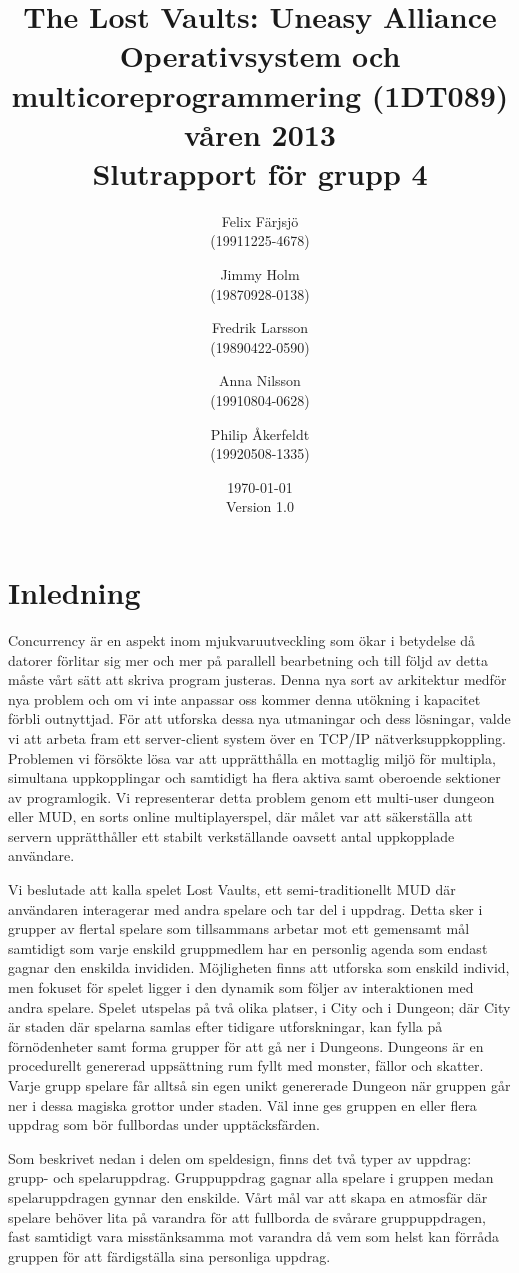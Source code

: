 \documentclass[a4paper]{article}
\title{The Lost Vaults: Uneasy Alliance\\\small{Operativsystem och multicoreprogrammering (1DT089) våren 2013}\\\small{Slutrapport för grupp 4}}
\author{Felix Färjsjö\\(19911225-4678) \and Jimmy Holm\\(19870928-0138) \and Fredrik Larsson\\(19890422-0590) \and Anna Nilsson\\(19910804-0628) \and Philip Åkerfeldt\\(19920508-1335)}
\date{\today\\Version 1.0}
\begin{document}
\maketitle
\newpage
\tableofcontents
\listoffigures
\newpage
\section{Inledning}
Concurrency är en aspekt inom mjukvaruutveckling som ökar i betydelse då datorer förlitar sig mer och mer på parallell bearbetning och till följd av detta måste vårt sätt att skriva 
program justeras. Denna nya sort av arkitektur medför nya problem och om vi inte anpassar oss kommer denna utökning i kapacitet förbli outnyttjad. För att utforska dessa nya utmaningar 
och dess lösningar, valde vi att arbeta fram ett server-client system över en TCP/IP nätverksuppkoppling. Problemen vi försökte lösa var att upprätthålla en mottaglig miljö för multipla, 
simultana uppkopplingar och samtidigt ha flera aktiva samt oberoende sektioner av programlogik. Vi representerar detta problem genom ett multi-user dungeon eller MUD, 
en sorts online multiplayerspel, där målet var att säkerställa att servern upprätthåller ett stabilt verkställande oavsett antal uppkopplade användare.
    
Vi beslutade att kalla spelet Lost Vaults, ett semi-traditionellt MUD där användaren interagerar med andra spelare och tar del i uppdrag. Detta sker i grupper av flertal spelare som 
tillsammans arbetar mot ett gemensamt mål samtidigt som varje enskild gruppmedlem har en personlig agenda som endast gagnar den enskilda invididen. Möjligheten finns att utforska som 
enskild individ, men fokuset för spelet ligger i den dynamik som följer av interaktionen med andra spelare. Spelet utspelas på två olika platser, i City och i Dungeon; där City är 
staden där spelarna samlas efter tidigare utforskningar, kan fylla på förnödenheter samt forma grupper för att gå ner i Dungeons. Dungeons är en procedurellt genererad uppsättning 
rum fyllt med monster, fällor och skatter. Varje grupp spelare får alltså sin egen unikt genererade Dungeon när gruppen går ner i dessa magiska grottor under staden. Väl inne ges 
gruppen en eller flera uppdrag som bör fullbordas under upptäcksfärden.
  
Som beskrivet nedan i delen om speldesign, finns det två typer av uppdrag: grupp- och spelaruppdrag. Gruppuppdrag gagnar alla spelare i gruppen medan spelaruppdragen gynnar den enskilde. 
Vårt mål var att skapa en atmosfär där spelare behöver lita på varandra för att fullborda de svårare gruppuppdragen, fast samtidigt vara misstänksamma mot varandra då vem som helst kan 
förråda gruppen för att färdigställa sina personliga uppdrag.
 
\end{document}
